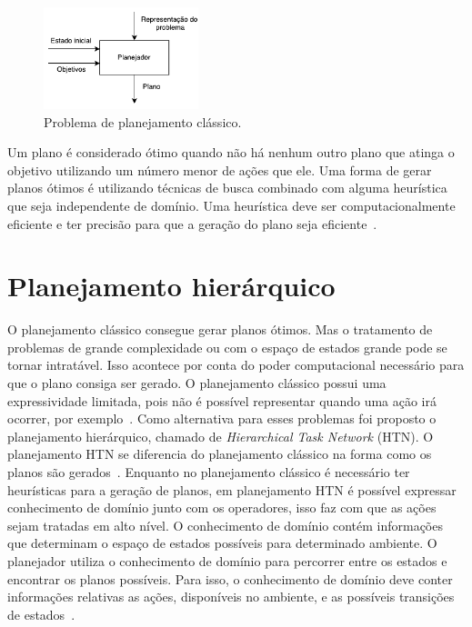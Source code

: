 \begin{figure}[ht]
	\centering
	\includegraphics[width=0.4\textwidth]{fig/modelo.pdf}
	\caption{Problema de planejamento clássico.}
	\label{fig:planmodelo}
\end{figure} 

Um plano é considerado ótimo quando não há nenhum outro plano que atinga o objetivo utilizando um número menor de ações que ele.
Uma forma de gerar planos ótimos é utilizando técnicas de busca combinado com alguma heurística que seja independente de domínio.
Uma heurística deve ser computacionalmente eficiente e ter precisão para que a geração do plano seja eficiente~\cite{helmert2007flexible}.

\section{Planejamento hierárquico} 
\label{sec:htnPlanning}

O planejamento clássico consegue gerar planos ótimos.
Mas o tratamento de problemas de grande complexidade ou com o espaço de estados grande pode se tornar intratável.
Isso acontece por conta do poder computacional necessário para que o plano consiga ser gerado.
O planejamento clássico possui uma expressividade limitada, pois não é possível representar quando uma ação irá ocorrer, por exemplo~\cite[Capítulo 11]{intelligence2003modern}.
Como alternativa para esses problemas foi proposto o planejamento hierárquico, chamado de \textit{Hierarchical Task Network} (HTN). 
O planejamento HTN se diferencia do planejamento clássico na forma como os planos são gerados~\cite{ghallab2004automated}. 
Enquanto no planejamento clássico é necessário ter heurísticas para a geração de planos, em planejamento HTN é possível expressar conhecimento de domínio junto com os operadores, isso faz com que as ações sejam tratadas em alto nível.  
O conhecimento de domínio contém informações que determinam o espaço de estados possíveis para determinado ambiente. O planejador utiliza o conhecimento de domínio para percorrer entre os estados e encontrar os planos possíveis. Para isso, o conhecimento de domínio deve conter informações relativas as ações, disponíveis no ambiente, e as possíveis transições de estados~\cite[Capítulo 11]{intelligence2003modern}.

